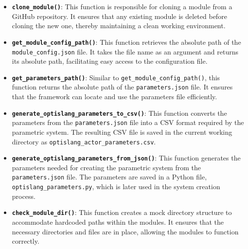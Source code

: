 \begin{itemize}
  \item \textbf{\texttt{clone\_module()}}:
  This function is responsible for cloning a module from a GitHub repository. It ensures that any existing module is deleted before cloning the new one, 
  thereby maintaining a clean working environment.

  \item \textbf{\texttt{get\_module\_config\_path()}}:
  This function retrieves the absolute path of the \texttt{module\_config.json} file. It takes the file name as an argument and returns its absolute path, 
  facilitating easy access to the configuration file.

  \item \textbf{\texttt{get\_parameters\_path()}}:
  Similar to \texttt{get\_module\_config\_path()}, this function returns the absolute path of the \texttt{parameters.json} file. It ensures that the framework 
  can locate and use the parameters file efficiently.

  \item \textbf{\texttt{generate\_optislang\_parameters\_to\_csv()}}:
  This function converts the parameters from the \texttt{parameters.json} file into a CSV format required by the parametric system. The resulting CSV file 
  is saved in the current working directory as \texttt{optislang\_actor\_parameters.csv}.

  \item \textbf{\texttt{generate\_optislang\_parameters\_from\_json()}}:
  This function generates the parameters needed for creating the parametric system from the \texttt{parameters.json} file. The parameters are saved in a Python 
  file, \texttt{optislang\_parameters.py}, which is later used in the system creation process.

  \item \textbf{\texttt{check\_module\_dir()}}:
  This function creates a mock directory structure to accommodate hardcoded paths within the modules. It ensures that the necessary directories and files are 
  in place, allowing the modules to function correctly.


\end{itemize}
